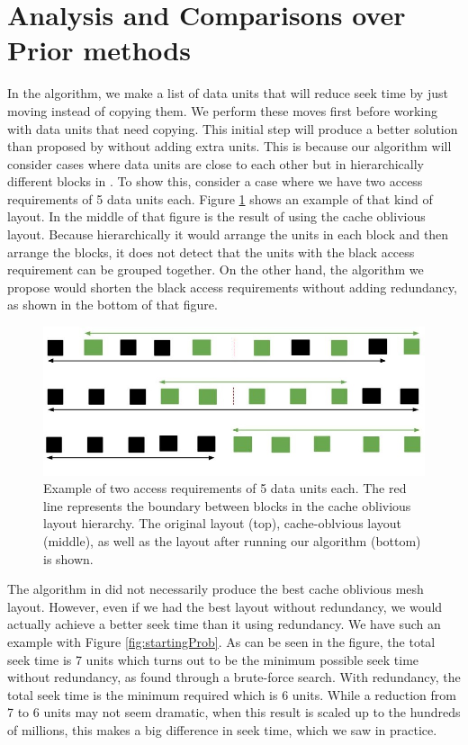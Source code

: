 
\section{Analysis and Comparisons over Prior methods}

In the algorithm, we make a list of data units that will reduce seek time by just moving instead of copying them. We perform these moves first before working with data units that need copying. This initial step will produce a better solution than proposed by \cite{cacheobliviouslayout} without adding extra units. This is because our algorithm will consider cases where data units are close to each other but in hierarchically different blocks in \cite{cacheobliviouslayout}. To show this, consider a case where we have two access requirements of 5 data units each. Figure \ref{YoonImprovement} shows an example of that kind of layout. In the middle of that figure is the result of using the cache oblivious layout. Because hierarchically it would arrange the units in each block and then arrange the blocks, it does not detect that the units with the black access requirement can be grouped together. On the other hand, the algorithm we propose would shorten the black access requirements without adding redundancy, as shown in the bottom of that figure.

\begin{figure}[ht]
\centering
\includegraphics[width=\columnwidth]{ImprovementOverYoon.jpg}
\caption{Example of two access requirements of 5 data units each. The red line represents the boundary between blocks in the cache oblivious layout hierarchy. The original layout (top), cache-oblvious layout (middle), as well as the layout after running our algorithm (bottom) is shown.}
\label{YoonImprovement}
\end{figure}

The algorithm in \cite{cacheobliviouslayout} did not necessarily produce the best cache oblivious mesh layout. However, even if we had the best layout without redundancy, we would actually achieve a better seek time than it using redundancy. We have such an example with Figure \ref{fig:startingProb}. As can be seen in the figure, the total seek time is 7 units which turns out to be the minimum possible seek time without redundancy, as found through a brute-force search. With redundancy, the total seek time is the minimum required which is 6 units. While a reduction from 7 to 6 units may not seem dramatic, when this result is scaled up to the hundreds of millions, this makes a big difference in seek time, which we saw in practice.\\

